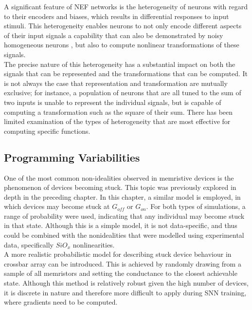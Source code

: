 \noindent A significant feature of NEF networks is the heterogeneity of neurons with regard to their encoders and biases, which results in differential responses to input stimuli. This heterogeneity enables neurons to not only encode different aspects of their input signals a capability that can also be demonstrated by noisy homogeneous neurons \cite{hunsberger2014competing}, but also to compute nonlinear transformations of these signals. \\

\noindent The precise nature of this heterogeneity has a substantial impact on both the signals that can be represented and the transformations that can be computed. It is not always the case that representation and transformation are mutually exclusive; for instance, a population of neurons that are all tuned to the sum of two inputs is unable to represent the individual signals, but is capable of computing a transformation such as the square of their sum. There has been limited examination of the types of heterogeneity that are most effective for computing specific functions.

\subsection{Programming Variabilities}

One of the most common non-idealities observed in memristive devices is the phenomenon of devices becoming stuck. This topic was previously explored in depth in the preceding chapter. In this chapter, a similar model is employed, in which devices may become stuck at $G_{off}$ or $G_{on}$. For both types of simulations, a range of probability were used, indicating that any individual may become stuck in that state. Although this is a simple model, it is not data-specific, and thus could be combined with the nonidealities that were modelled using experimental data, specifically $SiO_x$ nonlinearities.\\

\noindent A more realistic probabilistic model for describing stuck device behaviour in crossbar array can be introduced. This is achieved by randomly drawing from a sample of all memristors and setting the conductance to the closest achievable state. Although this method is relatively robust given the high number of devices, it is discrete in nature and therefore more difficult to apply during SNN training, where gradients need to be computed. \\

